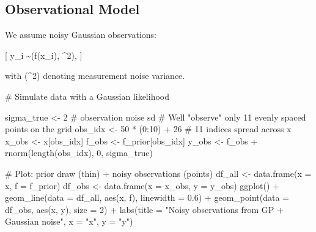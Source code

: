 \documentclass[
  letterpaper,
  DIV=11,
  numbers=noendperiod]{scrartcl}
\newenvironment{Shaded}{\begin{snugshade}}{\end{snugshade}}
\newcommand{\AttributeTok}[1]{\textcolor[rgb]{0.40,0.45,0.13}{#1}}
\newcommand{\CommentTok}[1]{\textcolor[rgb]{0.37,0.37,0.37}{#1}}
\newcommand{\DecValTok}[1]{\textcolor[rgb]{0.68,0.00,0.00}{#1}}
\newcommand{\FloatTok}[1]{\textcolor[rgb]{0.68,0.00,0.00}{#1}}
\newcommand{\FunctionTok}[1]{\textcolor[rgb]{0.28,0.35,0.67}{#1}}
\newcommand{\NormalTok}[1]{\textcolor[rgb]{0.00,0.23,0.31}{#1}}
\newcommand{\OtherTok}[1]{\textcolor[rgb]{0.00,0.23,0.31}{#1}}
\newcommand{\SpecialCharTok}[1]{\textcolor[rgb]{0.37,0.37,0.37}{#1}}
\newcommand{\StringTok}[1]{\textcolor[rgb]{0.13,0.47,0.30}{#1}}
\begin{document}
\subsection{Observational Model}\label{observational-model}

We assume noisy Gaussian observations:

{[} y\_i \sim {}(f(x\_i), \sigma\^{}2), {]}

with (\sigma\^{}2) denoting measurement noise variance.

\begin{Shaded}
\begin{Highlighting}[]
\CommentTok{\#  Simulate data with a Gaussian likelihood }

\NormalTok{sigma\_true }\OtherTok{\textless{}{-}} \DecValTok{2}  \CommentTok{\# observation noise sd}
\CommentTok{\# We\textquotesingle{}ll "observe" only 11 evenly spaced points on the grid }
\NormalTok{obs\_idx }\OtherTok{\textless{}{-}} \DecValTok{50} \SpecialCharTok{*}\NormalTok{ (}\DecValTok{0}\SpecialCharTok{:}\DecValTok{10}\NormalTok{) }\SpecialCharTok{+} \DecValTok{26}   \CommentTok{\# 11 indices spread across x}
\NormalTok{x\_obs   }\OtherTok{\textless{}{-}}\NormalTok{ x[obs\_idx]}
\NormalTok{f\_obs   }\OtherTok{\textless{}{-}}\NormalTok{ f\_prior[obs\_idx]}
\NormalTok{y\_obs   }\OtherTok{\textless{}{-}}\NormalTok{ f\_obs }\SpecialCharTok{+} \FunctionTok{rnorm}\NormalTok{(}\FunctionTok{length}\NormalTok{(obs\_idx), }\DecValTok{0}\NormalTok{, sigma\_true)}

\CommentTok{\# Plot: prior draw (thin) + noisy observations (points)}
\NormalTok{df\_all }\OtherTok{\textless{}{-}} \FunctionTok{data.frame}\NormalTok{(}\AttributeTok{x =}\NormalTok{ x, }\AttributeTok{f =}\NormalTok{ f\_prior)}
\NormalTok{df\_obs }\OtherTok{\textless{}{-}} \FunctionTok{data.frame}\NormalTok{(}\AttributeTok{x =}\NormalTok{ x\_obs, }\AttributeTok{y =}\NormalTok{ y\_obs)}
\FunctionTok{ggplot}\NormalTok{() }\SpecialCharTok{+}
  \FunctionTok{geom\_line}\NormalTok{(}\AttributeTok{data =}\NormalTok{ df\_all, }\FunctionTok{aes}\NormalTok{(x, f), }\AttributeTok{linewidth =} \FloatTok{0.6}\NormalTok{) }\SpecialCharTok{+}
  \FunctionTok{geom\_point}\NormalTok{(}\AttributeTok{data =}\NormalTok{ df\_obs, }\FunctionTok{aes}\NormalTok{(x, y), }\AttributeTok{size =} \DecValTok{2}\NormalTok{) }\SpecialCharTok{+}
  \FunctionTok{labs}\NormalTok{(}\AttributeTok{title =} \StringTok{"Noisy observations from GP + Gaussian noise"}\NormalTok{,}
       \AttributeTok{x =} \StringTok{"x"}\NormalTok{, }\AttributeTok{y =} \StringTok{"y"}\NormalTok{)}
\end{Highlighting}
\end{Shaded}
\end{document}
